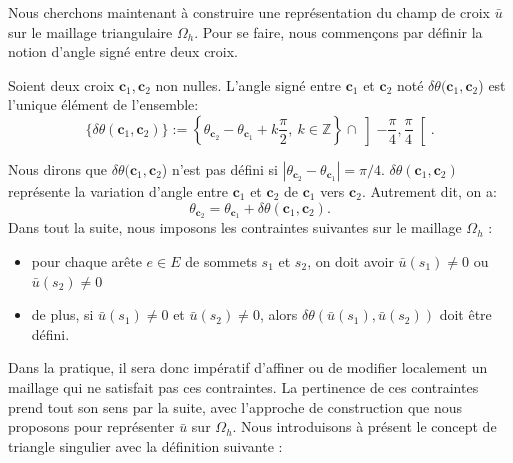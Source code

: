 Nous cherchons maintenant à construire une représentation du champ de croix $\bar{u}$ sur le maillage triangulaire $\Omega_h$. Pour se faire, nous commençons par définir la notion d'angle signé entre deux croix.

\begin{definition}
Soient deux croix $\mathbf{c}_1,\mathbf{c}_2$ non nulles. L'angle signé entre $\mathbf{c}_1$ et $\mathbf{c}_2$ noté $\delta\theta(\mathbf{c}_1,\mathbf{c}_2$) est l'unique élément de l'ensemble:
$$
\{\delta\theta(\mathbf{c}_1,\mathbf{c}_2)\}:=\left\{\theta_{\mathbf{c}_2}-\theta_{\mathbf{c}_1}+k\frac{\pi}{2},~k\in\mathbb{Z}\right\}\cap\left]-\frac{\pi}{4}, \frac{\pi}{4}\right[.
$$
\end{definition}
Nous dirons que $\delta\theta(\mathbf{c}_1,\mathbf{c}_2$) n'est pas défini si $|\theta_{\mathbf{c}_2}-\theta_{\mathbf{c}_1}|=\pi/4$. $\delta\theta(\mathbf{c}_1, \mathbf{c}_2)$ représente la variation d'angle entre $\mathbf{c}_1$ et $\mathbf{c}_2$ de $\mathbf{c}_1$ vers $\mathbf{c}_2$. Autrement dit, on a:
$$
\theta_{\mathbf{c}_2}=\theta_{\mathbf{c}_1}+\delta\theta(\mathbf{c}_1,\mathbf{c}_2).
$$
Dans tout la suite, nous imposons les contraintes suivantes sur le maillage $\Omega_h$ :\\[-0.2cm]
\begin{itemize}
 \item pour chaque arête $e\in E$ de sommets $s_1$ et $s_2$, on doit avoir $\bar{u}(s_1)\neq 0$ ou $\bar{u}(s_2)\neq 0$\\[-0.2cm]
 \item de plus, si $\bar{u}(s_1)\neq 0$ et $\bar{u}(s_2)\neq 0$, alors $\delta\theta(\bar{u}(s_1), \bar{u}(s_2))$ doit être défini.\\[-0.2cm]
\end{itemize}
Dans la pratique, il sera donc impératif d'affiner ou de modifier localement un maillage qui ne satisfait pas ces contraintes. La pertinence de ces contraintes prend tout son sens par la suite, avec l'approche de construction que nous proposons pour représenter $\bar{u}$ sur $\Omega_h$. Nous introduisons à présent le concept de triangle singulier avec la définition suivante :

